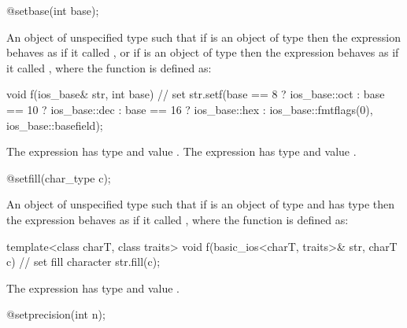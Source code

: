 %
\begin{itemdecl}
@\unspec@ setbase(int base);
\end{itemdecl}

\begin{itemdescr}
\pnum
\returns
An object of unspecified type such that if
is an object of type
then the expression
behaves as if it called
,
or if
is an object of type
then the expression
behaves as if it called
, where the function  is defined as:

\begin{codeblock}
void f(ios_base& str, int base) {
  // set 
  str.setf(base ==  8 ? ios_base::oct :
      base == 10 ? ios_base::dec :
      base == 16 ? ios_base::hex :
      ios_base::fmtflags(0), ios_base::basefield);
}
\end{codeblock}

The expression
has type
and value
.
The expression
has type
and value
.
\end{itemdescr}

%
\begin{itemdecl}
@\unspec@ setfill(char_type c);
\end{itemdecl}

\begin{itemdescr}
\pnum
\returns
An object of unspecified type such that if
is an object of type
and  has type
then the expression
behaves as if it called
, where the function  is defined as:

\begin{codeblock}
template<class charT, class traits>
void f(basic_ios<charT, traits>& str, charT c) {
  // set fill character
  str.fill(c);
}
\end{codeblock}

The expression
has type
and value
.
\end{itemdescr}

%
\begin{itemdecl}
@\unspec@ setprecision(int n);
\end{itemdecl}

